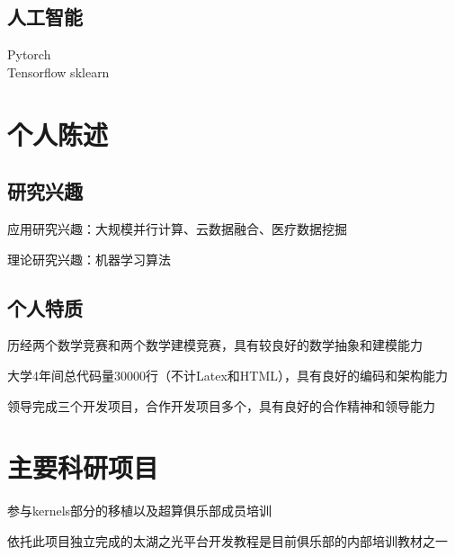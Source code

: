 \documentclass[]{deedy-resume-openfont}
\begin{document}
\begin{minipage}[t]{0.25\textwidth}
	\subsection{人工智能}
	Pytorch \\
	Tensorflow \textbullet{} sklearn \\
    \sectionsep

\end{minipage}
\hfill
\begin{minipage}[t]{0.73\textwidth}
    \section{个人陈述}
    \subsection{研究兴趣}
    \vspace{\topsep}
	\begin{tightemize}
		\item 应用研究兴趣：大规模并行计算、云数据融合、医疗数据挖掘
		\item 理论研究兴趣：机器学习算法
	\end{tightemize}
    \subsection{个人特质}
    \vspace{\topsep}
    \begin{tightemize}
        \item 历经两个数学竞赛和两个数学建模竞赛，具有较良好的数学抽象和建模能力
		\item 大学4年间总代码量30000行（不计Latex和HTML），具有良好的编码和架构能力
		\item 领导完成三个开发项目，合作开发项目多个，具有良好的合作精神和领导能力
	\end{tightemize}
    \sectionsep

	

	\section{主要科研项目}
	\descript{}
	\begin{tightemize}
		\item 参与kernels部分的移植以及超算俱乐部成员培训
		\item 依托此项目独立完成的太湖之光平台开发教程是目前俱乐部的内部培训教材之一
	\end{tightemize}
    \sectionsep


\end{minipage}
\end{document}
